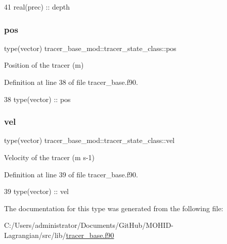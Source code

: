 \begin{DoxyCode}
41         \textcolor{keywordtype}{real(prec)} :: depth
\end{DoxyCode}
\mbox{\label{structtracer__base__mod_1_1tracer__state__class_a1b258c263cb63d6f03f08b6d969f94d7}} 
\subsubsection{\texorpdfstring{pos}{pos}}
{\footnotesize\ttfamily type(vector) tracer\+\_\+base\+\_\+mod\+::tracer\+\_\+state\+\_\+class\+::pos\hspace{0.3cm}{\ttfamily [private]}}



Position of the tracer (m) 



Definition at line 38 of file tracer\+\_\+base.\+f90.


\begin{DoxyCode}
38         \textcolor{keywordtype}{type}(vector) :: pos
\end{DoxyCode}
\mbox{\label{structtracer__base__mod_1_1tracer__state__class_a3ea133d907fd662b8be1bdb540e2929d}} 
\subsubsection{\texorpdfstring{vel}{vel}}
{\footnotesize\ttfamily type(vector) tracer\+\_\+base\+\_\+mod\+::tracer\+\_\+state\+\_\+class\+::vel\hspace{0.3cm}{\ttfamily [private]}}



Velocity of the tracer (m s-\/1) 



Definition at line 39 of file tracer\+\_\+base.\+f90.


\begin{DoxyCode}
39         \textcolor{keywordtype}{type}(vector) :: vel
\end{DoxyCode}


The documentation for this type was generated from the following file\+:\begin{DoxyCompactItemize}
\item 
C\+:/\+Users/administrator/\+Documents/\+Git\+Hub/\+M\+O\+H\+I\+D-\/\+Lagrangian/src/lib/\mbox{\hyperlink{tracer__base_8f90}{tracer\+\_\+base.\+f90}}\end{DoxyCompactItemize}
